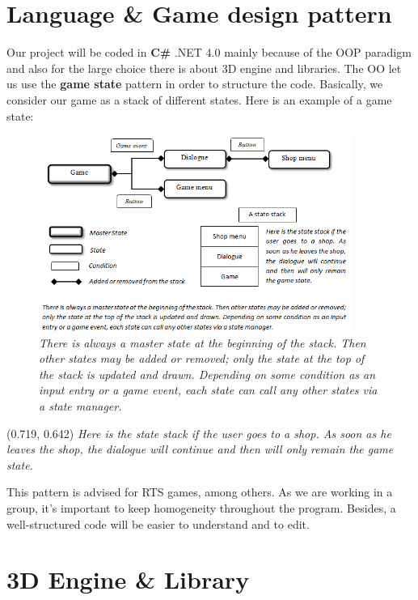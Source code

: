 \documentclass[article]{report} %
\begin{document}
     				\section{Language \& Game design pattern}
     						Our project will be coded in \textbf{C\#} .NET 4.0 mainly because of the \ac{OOP} paradigm and also for the large choice there is about 3D engine and libraries. The OO let us use the \textbf{game state} pattern in order to structure the code. Basically, we consider our game as a stack of different states. Here is an example of a game state:
							\begin{figure}[h]
							
									\centering
									\includegraphics[height=242px]{Images/GameStateDesign.png}
									\it \\ There is always a master state at the beginning of the stack. Then other states may be added or removed; only the state at the top of the stack is updated and drawn. Depending on some condition as an input entry or a game event, each state can call any other states via a state manager.
							\end{figure}

							\begin{textblock}{0.128}(0.719, 0.642)
									\noindent \it 	Here is the state stack if the user goes to a shop. As soon as he leaves the shop, the dialogue will continue and then will only remain the game state.
							\end{textblock}
     						
     						This pattern is advised for \ac{RTS} games, among others. As we are working in a group, it\textquoteright s important to keep homogeneity throughout the program. Besides, a well-structured code will be easier to understand and to edit.
						
						\section{3D Engine \& Library}
						
\end{document}
